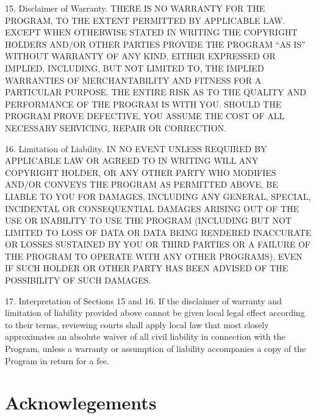 \documentclass {scrbook}
\begin{document}
\begin{tiny}
15. Disclaimer of Warranty. THERE IS NO WARRANTY FOR THE PROGRAM, TO THE EXTENT PERMITTED BY APPLICABLE LAW. EXCEPT WHEN OTHERWISE STATED IN WRITING THE COPYRIGHT HOLDERS AND/OR OTHER PARTIES PROVIDE THE PROGRAM ``AS IS'' WITHOUT WARRANTY OF ANY KIND, EITHER EXPRESSED OR IMPLIED, INCLUDING, BUT NOT LIMITED TO, THE IMPLIED WARRANTIES OF MERCHANTABILITY AND FITNESS FOR A PARTICULAR PURPOSE. THE ENTIRE RISK AS TO THE QUALITY AND PERFORMANCE OF THE PROGRAM IS WITH YOU. SHOULD THE PROGRAM PROVE DEFECTIVE, YOU ASSUME THE COST OF ALL NECESSARY SERVICING, REPAIR OR CORRECTION.

16. Limitation of Liability. IN NO EVENT UNLESS REQUIRED BY APPLICABLE LAW OR AGREED TO IN WRITING WILL ANY COPYRIGHT HOLDER, OR ANY OTHER PARTY WHO MODIFIES AND/OR CONVEYS THE PROGRAM AS PERMITTED ABOVE, BE LIABLE TO YOU FOR DAMAGES, INCLUDING ANY GENERAL, SPECIAL, INCIDENTAL OR CONSEQUENTIAL DAMAGES ARISING OUT OF THE USE OR INABILITY TO USE THE PROGRAM (INCLUDING BUT NOT LIMITED TO LOSS OF DATA OR DATA BEING RENDERED INACCURATE OR LOSSES SUSTAINED BY YOU OR THIRD PARTIES OR A FAILURE OF THE PROGRAM TO OPERATE WITH ANY OTHER PROGRAMS), EVEN IF SUCH HOLDER OR OTHER PARTY HAS BEEN ADVISED OF THE POSSIBILITY OF SUCH DAMAGES.

17. Interpretation of Sections 15 and 16. If the disclaimer of warranty and limitation of liability provided above cannot be given local legal effect according to their terms, reviewing courts shall apply local law that most closely approximates an absolute waiver of all civil liability in connection with the Program, unless a warranty or assumption of liability accompanies a copy of the Program in return for a fee.

\end{tiny}


\chapter{Acknowlegements}
\end{document}
